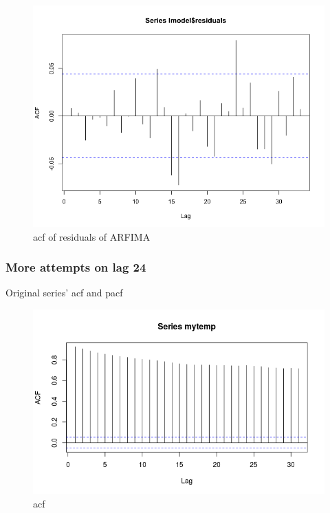 \documentclass[a4paper,11pt]{article}
\begin{document}
\begin{figure}[H]
\centering
\caption{acf of residuals of ARFIMA}
\includegraphics[scale=.5]{longacf.png}
\end{figure}


\subsubsection{More attempts on lag 24}
Original series' acf and pacf

\begin{figure}[H]
\centering
\caption{acf}
\includegraphics[scale=.70]{mytemp_acf.png}
\end{figure}
\end{document}
